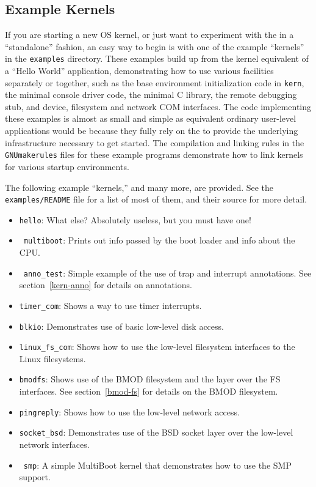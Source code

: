 \subsection{Example Kernels}
\label{example-kernels}

If you are starting a new OS kernel,
or just want to experiment with the \oskit{} in a ``standalone'' fashion,
an easy way to begin is with one of
the example ``kernels'' in the {\tt examples} directory.
These examples build up from the kernel equivalent of a ``Hello World'' application,
demonstrating how to use various facilities separately or together,
such as the base environment initialization code in {\tt kern},
the minimal console driver code,
the minimal C library,
the remote debugging stub, and
device, filesystem and network COM interfaces.
The code implementing these examples is almost as small and simple
as equivalent ordinary user-level applications would be
because they fully rely on the \oskit{}
to provide the underlying infrastructure necessary to get started.
The compilation and linking rules in the {\tt GNUmakerules} files
for these example programs
demonstrate how to link kernels for various startup environments.

The following example ``kernels,'' and many more, are provided.
See the \texttt{examples/README} file for a list of most of them, and
their source for more detail.

\begin{itemize}
\item	\texttt{hello}:
	What else?  Absolutely useless, but you must have one!
\item	\intelpc\ \texttt{multiboot}:
	Prints out info passed by the boot loader and info about the CPU.
\item	\intelpc\ \texttt{anno_test}:
	Simple example of the use of trap and interrupt annotations.
	See section~\ref{kern-anno} for details on annotations.
\item	\texttt{timer_com}:
	Shows a way to use timer interrupts.
\item	\texttt{blkio}:
	Demonstrates use of basic low-level disk access.
\item	\texttt{linux_fs_com}:
	Shows how to use the low-level filesystem interfaces to the Linux
	filesystems.
\item	\texttt{bmodfs}:
	Shows use of the BMOD filesystem and the \posix{} layer over
	the \oskit{} FS interfaces.
	See section~\ref{bmod-fs} for details on the BMOD filesystem.
\item	\texttt{pingreply}:
	Shows how to use the low-level network access.
\item	\texttt{socket_bsd}:
	Demonstrates use of the BSD socket layer over the low-level
	network interfaces.
\item	\intelpc\ \texttt{smp}:
	A simple MultiBoot kernel that demonstrates how to use the
	SMP support.
\end{itemize}

